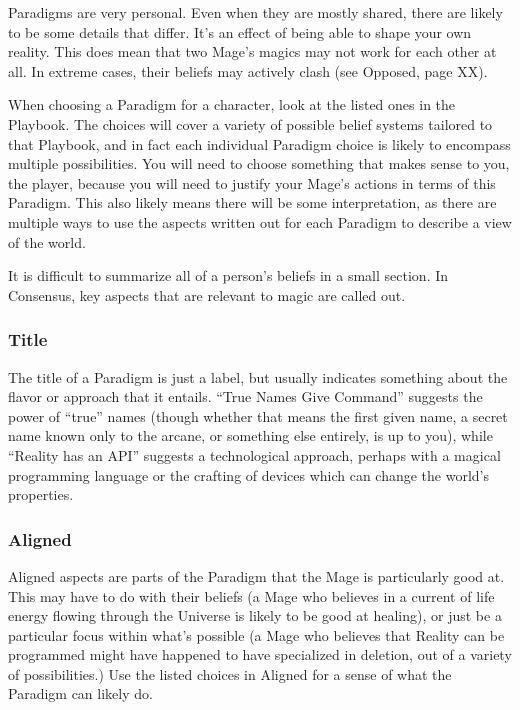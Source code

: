\documentclass[
]{article}
\begin{document}
Paradigms are very personal. Even when they are mostly shared, there are
likely to be some details that differ. It's an effect of being able to
shape your own reality. This does mean that two Mage's magics may not
work for each other at all. In extreme cases, their beliefs may actively
clash (see Opposed, page XX).

When choosing a Paradigm for a character, look at the listed ones in the
Playbook. The choices will cover a variety of possible belief systems
tailored to that Playbook, and in fact each individual Paradigm choice
is likely to encompass multiple possibilities. You will need to choose
something that makes sense to you, the player, because you will need to
justify your Mage's actions in terms of this Paradigm. This also likely
means there will be some interpretation, as there are multiple ways to
use the aspects written out for each Paradigm to describe a view of the
world.

It is difficult to summarize all of a person's beliefs in a small
section. In Consensus, key aspects that are relevant to magic are called
out.

\hypertarget{title}{%
\subsubsection{Title}\label{title}}

The title of a Paradigm is just a label, but usually indicates something
about the flavor or approach that it entails. ``True Names Give
Command'' suggests the power of ``true'' names (though whether that
means the first given name, a secret name known only to the arcane, or
something else entirely, is up to you), while ``Reality has an API''
suggests a technological approach, perhaps with a magical programming
language or the crafting of devices which can change the world's
properties.

\hypertarget{aligned}{%
\subsubsection{Aligned}\label{aligned}}

Aligned aspects are parts of the Paradigm that the Mage is particularly
good at. This may have to do with their beliefs (a Mage who believes in
a current of life energy flowing through the Universe is likely to be
good at healing), or just be a particular focus within what's possible
(a Mage who believes that Reality can be programmed might have happened
to have specialized in deletion, out of a variety of possibilities.) Use
the listed choices in Aligned for a sense of what the Paradigm can
likely do.
\end{document}
